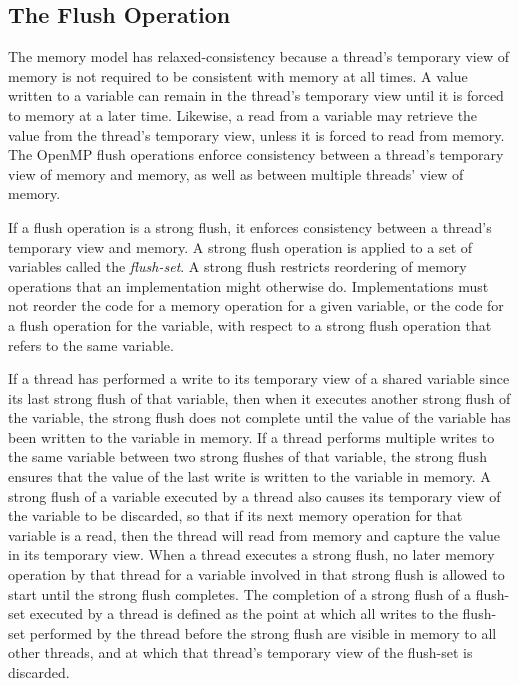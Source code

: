 \subsection{The Flush Operation}
\label{subsec:The Flush Operation}


The memory model has relaxed-consistency because a thread's temporary view of
memory is not required to be consistent with memory at all times. A value
written to a variable can remain in the thread's temporary view until it is
forced to memory at a later time. Likewise, a read from a variable may
retrieve the value from the thread's temporary view, unless it is forced to
read from memory.  The OpenMP flush operations enforce consistency between 
a thread's temporary view of memory and memory, as well as between multiple 
threads' view of memory.

If a flush operation is a strong flush, it enforces consistency between a
thread's temporary view and memory.  A strong flush operation is applied to a
set of variables called the \emph{flush-set}. A strong flush restricts
reordering of memory operations that an implementation might otherwise do.
Implementations must not reorder the code for a memory operation for a given
variable, or the code for a flush operation for the variable, with respect to
a strong flush operation that refers to the same variable.

If a thread has performed a write to its temporary view of a shared variable
since its last strong flush of that variable, then when it executes another
strong flush of the variable, the strong flush does not complete until the
value of the variable has been written to the variable in memory. If a thread
performs multiple writes to the same variable between two strong flushes of
that variable, the strong flush ensures that the value of the last write is
written to the variable in memory. A strong flush of a variable executed by a
thread also causes its temporary view of the variable to be discarded, so that
if its next memory operation for that variable is a read, then the thread will
read from memory and capture the value in its temporary view.
When a thread executes a strong flush, no later memory operation by that
thread for a variable involved in that strong flush is allowed to start until
the strong flush completes.  The completion of a strong flush 
of a flush-set executed by a thread is defined as the point at which 
all writes to the flush-set performed by the thread before the strong 
flush are visible in memory to all other threads, and at which that 
thread's temporary view of the flush-set is discarded.

